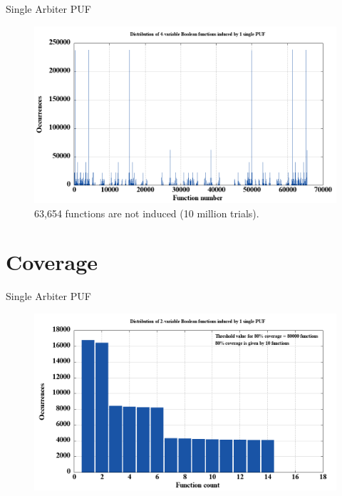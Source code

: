 \documentclass[10pt, compress]{beamer}
\begin{document}
\begin{frame}{Single Arbiter PUF}
    \begin{figure}
        \centering
        \includegraphics[width=\textwidth]{figures/dist/distribution_of_4-variable_boolean_functions_induced_by_1_single_puf.png}
        \caption{63,654 functions are not induced (10 million trials).}
    \end{figure}
\end{frame}

\section{Coverage}

\begin{frame}{Single Arbiter PUF}
    \begin{figure}
        \centering
        \includegraphics[width=\textwidth]{figures/sorted/distribution_of_2-variable_boolean_functions_induced_by_1_single_puf.png}
    \end{figure}
\end{frame}
\end{document}
